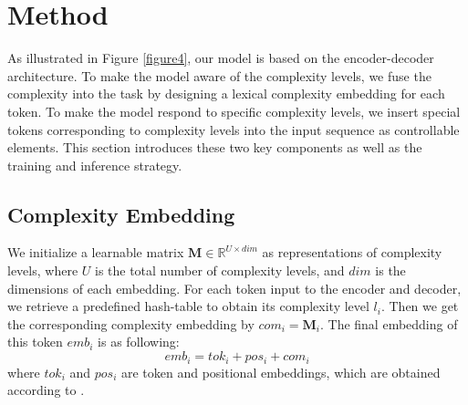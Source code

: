 \documentclass[11pt]{article}
\begin{document}

\section{Method}
As illustrated in Figure \ref{figure4}, our model is based on the encoder-decoder architecture.
To make the model aware of the complexity levels, we fuse the complexity into the task by designing a lexical complexity embedding for each token.
To make the model respond to specific complexity levels, we insert special tokens corresponding to complexity levels into the input sequence as controllable elements.
This section introduces these two key components as well as the training and inference strategy.

\subsection{Complexity Embedding}
We initialize a learnable matrix $\mathbf{M} \in \mathbb{R}^{U\times dim}$ as representations of complexity levels, where $U$ is the total number of complexity levels, and $dim$ is the dimensions of each embedding.
For each token input to the encoder and decoder, we retrieve a predefined hash-table to obtain its complexity level $l_i$.
Then we get the corresponding complexity embedding by $com_i = \mathbf{M}_i$.
The final embedding of this token $emb_i$ is as following:
\begin{equation}
    emb_i = tok_i + pos_i + com_i
\end{equation}
where $tok_i$ and $pos_i$ are token and positional embeddings, which are obtained according to \citet{Transformer}.
\end{document}
